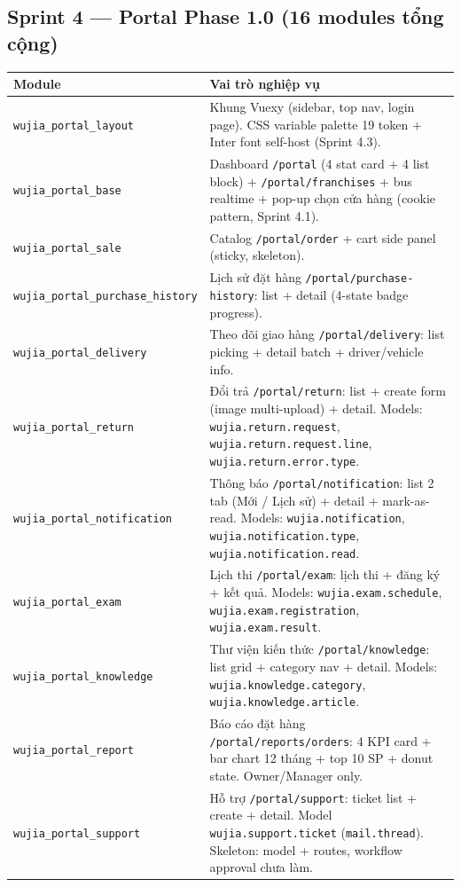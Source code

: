 \subsection{Sprint 4 --- Portal Phase 1.0 (16 modules tổng cộng)}

\begin{longtable}{p{4.5cm} p{9.5cm}}
\toprule
\textbf{Module} & \textbf{Vai trò nghiệp vụ} \\
\midrule
\endhead
\texttt{wujia\_portal\_layout} & Khung Vuexy (sidebar, top nav, login page). CSS variable palette 19 token + Inter font self-host (Sprint 4.3). \\
\texttt{wujia\_portal\_base} & Dashboard \texttt{/portal} (4 stat card + 4 list block) + \texttt{/portal/franchises} + bus realtime + pop-up chọn cửa hàng (cookie pattern, Sprint 4.1). \\
\texttt{wujia\_portal\_sale} & Catalog \texttt{/portal/order} + cart side panel (sticky, skeleton). \\
\texttt{wujia\_portal\_purchase\_history} & Lịch sử đặt hàng \texttt{/portal/purchase-history}: list + detail (4-state badge progress). \\
\texttt{wujia\_portal\_delivery} & Theo dõi giao hàng \texttt{/portal/delivery}: list picking + detail batch + driver/vehicle info. \\
\texttt{wujia\_portal\_return} & Đổi trả \texttt{/portal/return}: list + create form (image multi-upload) + detail. Models: \texttt{wujia.return.request}, \texttt{wujia.return.request.line}, \texttt{wujia.return.error.type}. \\
\texttt{wujia\_portal\_notification} & Thông báo \texttt{/portal/notification}: list 2 tab (Mới / Lịch sử) + detail + mark-as-read. Models: \texttt{wujia.notification}, \texttt{wujia.notification.type}, \texttt{wujia.notification.read}. \\
\texttt{wujia\_portal\_exam} & Lịch thi \texttt{/portal/exam}: lịch thi + đăng ký + kết quả. Models: \texttt{wujia.exam.schedule}, \texttt{wujia.exam.registration}, \texttt{wujia.exam.result}. \\
\texttt{wujia\_portal\_knowledge} & Thư viện kiến thức \texttt{/portal/knowledge}: list grid + category nav + detail. Models: \texttt{wujia.knowledge.category}, \texttt{wujia.knowledge.article}. \\
\texttt{wujia\_portal\_report} & Báo cáo đặt hàng \texttt{/portal/reports/orders}: 4 KPI card + bar chart 12 tháng + top 10 SP + donut state. Owner/Manager only. \\
\texttt{wujia\_portal\_support} & Hỗ trợ \texttt{/portal/support}: ticket list + create + detail. Model \texttt{wujia.support.ticket} (\texttt{mail.thread}). Skeleton: model + routes, workflow approval chưa làm. \\
\bottomrule
\end{longtable}

